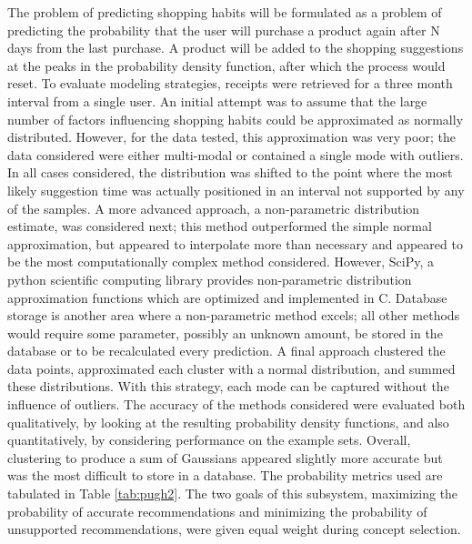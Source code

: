 \documentclass[11pt]{article} %
\begin{document}
The problem of predicting shopping habits will be formulated as a problem of predicting the probability that the user will purchase a product again after N days from the last purchase. A product will be added to the shopping suggestions at the peaks in the probability density function, after which the process would reset. To evaluate modeling strategies, receipts were retrieved for a three month interval from a single user. An initial attempt was to assume that the large number of factors influencing shopping habits could be approximated as normally distributed. However, for the data tested, this approximation was very poor; the data considered were either multi-modal or contained a single mode with outliers. In all cases considered, the distribution was shifted to the point where the most likely suggestion time was actually positioned in an interval not supported by any of the samples. A more advanced approach, a non-parametric distribution estimate, was considered next; this method outperformed the simple normal approximation, but appeared to interpolate more than necessary and appeared to be the most computationally complex method considered. However, SciPy, a python scientific computing library provides non-parametric distribution approximation functions which are optimized and implemented in C. Database storage is another area where a non-parametric method excels; all other methods would require some parameter, possibly an unknown amount, be stored in the database or to be recalculated every prediction. A final approach clustered the data points, approximated each cluster with a normal distribution, and summed these distributions. With this strategy, each mode can be captured without the influence of outliers. The accuracy of the methods considered were evaluated both qualitatively, by looking at the resulting probability density functions, and also quantitatively, by considering performance on the example sets. Overall, clustering to produce a sum of Gaussians appeared slightly more accurate but was the most difficult to store in a database. The probability metrics used are tabulated in Table \ref{tab:pugh2}. The two goals of this subsystem, maximizing the probability of accurate recommendations and minimizing the probability of unsupported recommendations, were given equal weight during concept selection.
\end{document}
